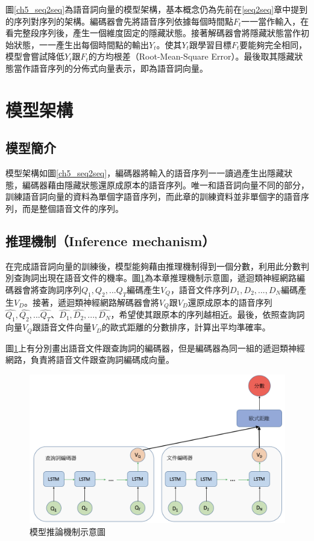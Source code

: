 圖\ref{ch5_seq2seq}為語音詞向量的模型架構，基本概念仍為先前在\ref{seq2seq}章中提到的序列對序列的架構。編碼器會先將語音序列依據每個時間點$F_t$一一當作輸入，在看完整段序列後，產生一個維度固定的隱藏狀態。接著解碼器會將隱藏狀態當作初始狀態，一一產生出每個時間點的輸出$Y_t$。使其$Y_t$跟學習目標$F_t$要能夠完全相同，模型會嘗試降低$Y_t$跟$F_t$的方均根差（Root-Mean-Square
Error）。最後取其隱藏狀態當作語音序列的分佈式向量表示，即為語音詞向量。
\section{模型架構}
\subsection{模型簡介}
模型架構如圖\ref{ch5_seq2seq}，編碼器將輸入的語音序列一一讀過產生出隱藏狀態，編碼器藉由隱藏狀態還原成原本的語音序列。唯一和語音詞向量不同的部分，訓練語音詞向量的資料為單個字語音序列，而此章的訓練資料並非單個字的語音序列，而是整個語音文件的序列。
\subsection{推理機制（Inference mechanism）}
在完成語音詞向量的訓練後，模型能夠藉由推理機制得到一個分數，利用此分數判別查詢詞出現在語音文件的機率。圖\ref{ch5_model}為本章推理機制示意圖，遞迴類神經網路編碼器會將查詢詞序列$Q_1,Q_2,...Q_T$編碼產生$V_Q$，語音文件序列$D_1,D_2,...,D_N$編碼產生$V_D$。接著，遞迴類神經網路解碼器會將$V_Q$跟$V_D$還原成原本的語音序列$\hat{Q_1},\hat{Q_2},...\hat{Q_T}$、$\hat{D_1},\hat{D_2},...,\hat{D_N}$，希望使其跟原本的序列越相近。最後，依照查詢詞向量$V_Q$跟語音文件向量$V_D$的歐式距離的分數排序，計算出平均準確率。

圖\ref{ch5_model}上有分別畫出語音文件跟查詢詞的編碼器，但是編碼器為同一組的遞迴類神經網路，負責將語音文件跟查詢詞編碼成向量。
\begin{figure}
\centering
\includegraphics[scale=0.5]{images/ch5_model.png} 
\caption{模型推論機制示意圖}
\label{ch5_model}
\end{figure}
